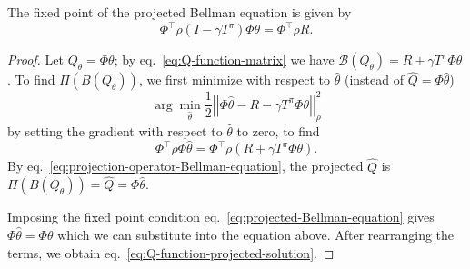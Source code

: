 \begin{theorem}
  The fixed point of the projected Bellman equation is given by
  \begin{equation}
    \label{eq:Q-function-projected-solution}
    \Phi^\top \rho \left(I - \gamma T^\pi\right) \Phi\theta = \Phi^\top\rho R.
  \end{equation}
\end{theorem}
\begin{proof}
  Let $Q_\theta = \Phi \theta$; by eq.~\eqref{eq:Q-function-matrix} we have $\mathcal{B}(Q_\theta) = R + \gamma T^\pi\Phi\theta$. To find $\Pi(B(Q_\theta))$, we first minimize with respect to $\hat{\theta}$ (instead of $\hat{Q} = \Phi\hat{\theta}$)
  \begin{equation*}
    \arg \min_{\hat{\theta}} \frac{1}{2} \left|\!\left| \Phi \hat{\theta} - R - \gamma T^\pi \Phi\theta \right|\!\right|^2_\rho
  \end{equation*}
  by setting the gradient with respect to $\hat{\theta}$ to zero, to find
  \begin{equation*}
    \Phi^\top\rho\Phi \hat{\theta} = \Phi^\top\rho\left(R + \gamma T^\pi \Phi\theta\right).
  \end{equation*}
  By eq.~\eqref{eq:projection-operator-Bellman-equation}, the projected $\hat{Q}$ is $\Pi(B(Q_\theta)) = \hat{Q} = \Phi\hat{\theta}$.

  Imposing the fixed point condition eq.~\eqref{eq:projected-Bellman-equation} gives $\Phi\hat{\theta} = \Phi\theta$ which we can substitute into the equation above. After rearranging the terms, we obtain eq.~\eqref{eq:Q-function-projected-solution}.
\end{proof}

